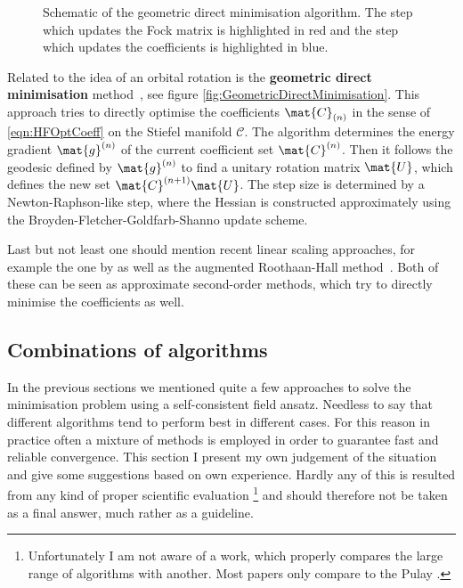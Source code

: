 \begin{figure}
	\centering
	\caption[Geometric direct minimisation algorithm]%
	{Schematic of the geometric direct minimisation algorithm.
	The step which updates the Fock matrix is highlighted in red
	and the step which updates the coefficients is highlighted in blue.
	}
	\label{fig:GeometricDirectMinimisation}
\end{figure}
Related to the idea of an orbital rotation \SCF
is the \textbf{geometric direct minimisation} method~\cite{Voorhis2002},
see figure \vref{fig:GeometricDirectMinimisation}.
This approach tries to directly
optimise the coefficients $\mat{C}_{(n)}$ in the sense of \eqref{eqn:HFOptCoeff}
on the Stiefel manifold $\mathcal{C}$.
The algorithm determines the energy gradient $\mat{g}^{(n)}$
of the current coefficient set $\mat{C}^{(n)}$.
Then it follows the geodesic defined by $\mat{g}^{(n)}$
to find a unitary rotation matrix $\mat{U}$,
which defines the new set $\mat{C}^{(n+1)} \mat{U}$.
The step size is determined by a Newton-Raphson-like step,
where the Hessian is constructed
approximately using the Broyden-Fletcher-Goldfarb-Shanno update scheme.

Last but not least one should mention recent linear scaling \SCF approaches,
for example the one by \citet{Salek2007}
as well as the augmented Roothaan-Hall method~\cite{Hoest2008}.
Both of these can be seen as approximate second-order \SCF methods,
which try to directly minimise the coefficients as well.

\subsection{Combinations of algorithms}
In the previous sections we mentioned quite a few approaches
to solve the \HF minimisation problem using a self-consistent field ansatz.
Needless to say that different algorithms tend to perform best in different cases.
For this reason in practice often a mixture of methods
is employed in order to guarantee fast and reliable convergence.
This section I present my own judgement of the situation
and give some suggestions based on own experience.
Hardly any of this is resulted from any kind of proper
scientific evaluation%
\footnote{Unfortunately I am not aware of a work,
which properly compares the large range of \SCF algorithms
with another.
Most papers only compare to the Pulay \DIIS.}
and should therefore not be taken as a final answer,
much rather as a guideline.

